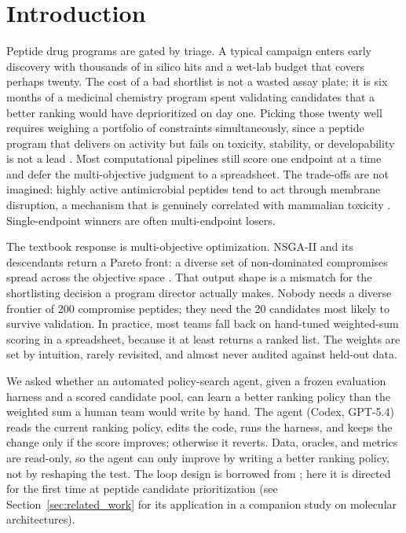 \section{Introduction}
\label{sec:introduction}

Peptide drug programs are gated by triage.
A typical campaign enters early discovery with thousands of in silico hits and a wet-lab budget that covers perhaps twenty.
The cost of a bad shortlist is not a wasted assay plate; it is six months of a medicinal chemistry program spent validating candidates that a better ranking would have deprioritized on day one.
Picking those twenty well requires weighing a portfolio of constraints simultaneously, since a peptide program that delivers on activity but fails on toxicity, stability, or developability is not a lead \citep{yan2022review}.
Most computational pipelines still score one endpoint at a time \citep{veltri2018ampscanner,rathore2024toxinpred3,sharma2014hlp} and defer the multi-objective judgment to a spreadsheet.
The trade-offs are not imagined: highly active antimicrobial peptides tend to act through membrane disruption, a mechanism that is genuinely correlated with mammalian toxicity \citep{matsuzaki2009control}.
Single-endpoint winners are often multi-endpoint losers.

The textbook response is multi-objective optimization.
NSGA-II \citep{deb2002nsga2} and its descendants return a Pareto front: a diverse set of non-dominated compromises spread across the objective space \citep{emmerich2018tutorial}.
That output shape is a mismatch for the shortlisting decision a program director actually makes.
Nobody needs a diverse frontier of 200 compromise peptides; they need the 20 candidates most likely to survive validation.
In practice, most teams fall back on hand-tuned weighted-sum scoring in a spreadsheet, because it at least returns a ranked list.
The weights are set by intuition, rarely revisited, and almost never audited against held-out data.

We asked whether an automated policy-search agent, given a frozen evaluation harness and a scored candidate pool, can learn a better ranking policy than the weighted sum a human team would write by hand.
The agent (Codex, GPT-5.4) reads the current ranking policy, edits the code, runs the harness, and keeps the change only if the score improves; otherwise it reverts.
Data, oracles, and metrics are read-only, so the agent can only improve by writing a better ranking policy, not by reshaping the test.
The loop design is borrowed from \citet{karpathy2026autoresearch}; here it is directed for the first time at peptide candidate prioritization (see Section~\ref{sec:related_work} for its application in a companion study on molecular architectures).

